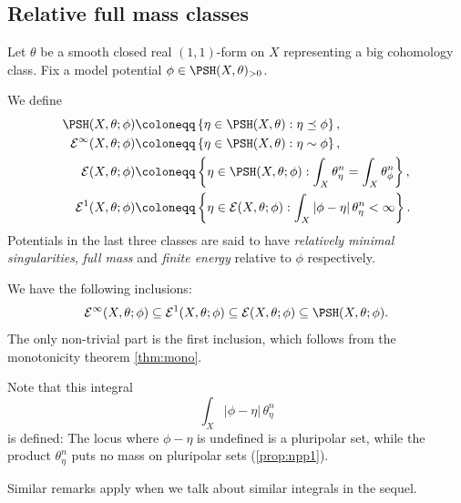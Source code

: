 \subsection{Relative full mass classes}\label{subsec:fullmass}
Let $\theta$ be a smooth closed real $(1,1)$-form on $X$ representing a big cohomology class. Fix a model potential $\phi\in \PSH(X,\theta)_{>0}$.



\begin{definition}\label{def:envelopes:L906}
    We define
    \[
        \begin{aligned}
        \PSH(X,\theta;\phi)\coloneqq &\left\{\eta\in \PSH(X,\theta): \eta\preceq \phi\right\},\\
        \mathcal{E}^{\infty}(X,\theta;\phi)\coloneqq &\left\{\eta\in \PSH(X,\theta): \eta\sim \phi\right\},\\
        \mathcal{E}(X,\theta;\phi)\coloneqq &\left\{\eta\in \PSH(X,\theta;\phi): \int_X \theta_{\eta}^n=\int_X \theta_{\phi}^n\right\},\\
        \mathcal{E}^1(X,\theta;\phi)\coloneqq &\left\{\eta\in \mathcal{E}(X,\theta;\phi): \int_X |\phi-\eta|\,\theta_{\eta}^n<\infty\right\}.
        \end{aligned}
    \]
     
    Potentials in the last three classes are said to have \emph{relatively minimal singularities}, \emph{full mass} and \emph{finite energy} relative to $\phi$ respectively.
\end{definition}
We have the following inclusions:
\begin{equation}\label{eq:energyclassinc}
\mathcal{E}^{\infty}(X,\theta;\phi)\subseteq \mathcal{E}^1(X,\theta;\phi)\subseteq \mathcal{E}(X,\theta;\phi)\subseteq \PSH(X,\theta;\phi).
\end{equation}
The only non-trivial part is the first inclusion, which follows from the monotonicity theorem \cref{thm:mono}.

\begin{remark}\label{rmk:intwelldef}
    Note that this integral
    \[
    \int_X |\phi-\eta|\,\theta_{\eta}^n
    \]
    is defined: The locus where $\phi-\eta$ is undefined is a pluripolar set, while the product $\theta_{\eta}^n$ puts no mass on pluripolar sets (\cref{prop:npp1}).

    Similar remarks apply when we talk about similar integrals in the sequel.
\end{remark}


